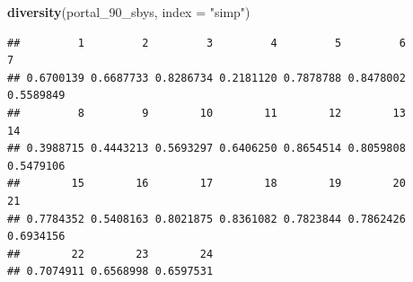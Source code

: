 \documentclass[]{article}
\newenvironment{Shaded}{\begin{snugshade}}{\end{snugshade}}
\newcommand{\KeywordTok}[1]{\textcolor[rgb]{0.13,0.29,0.53}{\textbf{{#1}}}}
\newcommand{\DataTypeTok}[1]{\textcolor[rgb]{0.13,0.29,0.53}{{#1}}}
\newcommand{\StringTok}[1]{\textcolor[rgb]{0.31,0.60,0.02}{{#1}}}
\newcommand{\NormalTok}[1]{{#1}}
\begin{document}
\begin{Shaded}
\begin{Highlighting}[]
\KeywordTok{diversity}\NormalTok{(portal_90_sbys, }\DataTypeTok{index =} \StringTok{"simp"}\NormalTok{)}
\end{Highlighting}
\end{Shaded}

\begin{verbatim}
##         1         2         3         4         5         6         7 
## 0.6700139 0.6687733 0.8286734 0.2181120 0.7878788 0.8478002 0.5589849 
##         8         9        10        11        12        13        14 
## 0.3988715 0.4443213 0.5693297 0.6406250 0.8654514 0.8059808 0.5479106 
##        15        16        17        18        19        20        21 
## 0.7784352 0.5408163 0.8021875 0.8361082 0.7823844 0.7862426 0.6934156 
##        22        23        24 
## 0.7074911 0.6568998 0.6597531
\end{verbatim}
\end{document}

